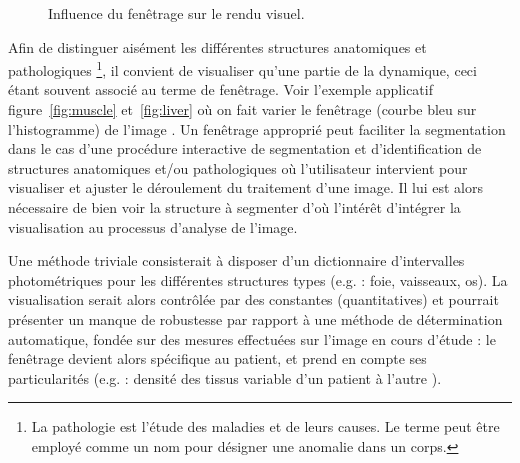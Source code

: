 	\begin{figure}[!ht]
	    \centering
		\hspace{0.3em}
	  \label{fig:vrrender}
	  \caption{Influence du fenêtrage sur le rendu visuel.}

	\end{figure}

	
	Afin de distinguer aisément les différentes structures anatomiques et pathologiques \footnote{La pathologie est l'étude des maladies et de leurs causes. Le terme peut être employé comme un nom pour désigner une anomalie dans un corps.}, il convient de visualiser qu'une partie de la dynamique, ceci étant souvent associé au terme de fenêtrage. Voir l'exemple applicatif figure~\ref{fig:muscle} et~\ref{fig:liver} où on fait varier le fenêtrage (courbe bleu sur l'histogramme) de l'image \citep[Gonzalez, Pratt]{Gonzalez2008}. Un fenêtrage approprié peut faciliter la segmentation dans le cas d'une procédure interactive de segmentation et d'identification de structures anatomiques et/ou pathologiques où l'utilisateur intervient pour visualiser et ajuster le déroulement du traitement d'une image. Il lui est alors nécessaire de bien voir la structure à segmenter d'où l'intérêt d'intégrer la visualisation au processus d'analyse de l'image.

	Une méthode triviale consisterait à disposer d'un dictionnaire d'intervalles photométriques pour les différentes structures types (e.g. : foie, vaisseaux, os). La visualisation serait alors contrôlée par des constantes (quantitatives) et pourrait présenter un manque de robustesse par rapport à une méthode de détermination automatique, fondée sur des mesures effectuées sur l'image en cours d'étude : le fenêtrage devient alors spécifique au patient, et prend en compte ses particularités (e.g. : densité des tissus variable d'un patient à l'autre \citep[Brown]{Brown1998}).
	

